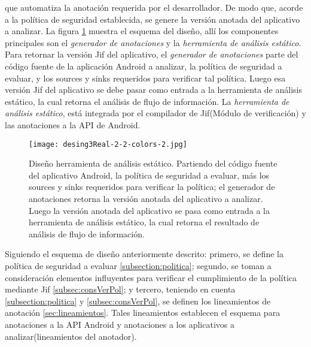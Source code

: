 que automatiza la anotación requerida por el desarrollador.
De modo que, acorde a la política de seguridad establecida, se genere la
versión anotada del aplicativo a analizar.\newline
La figura \ref{fig:desingReal} muestra el esquema del diseño, allí los componentes
principales son el \emph{generador de anotaciones} y la \emph{herramienta de
análisis estático}.\newline 
Para retornar la versión Jif del aplicativo, el \emph{generador de anotaciones}
parte del código fuente de la aplicación Android a analizar, la política de
seguridad a evaluar, y los sources y sinks requeridos para verificar tal
política.\newline 
Luego esa versión Jif del aplicativo se debe pasar como entrada a la herramienta
de análisis estático, la cual retorna el análisis de flujo de
información.\newline 
La \emph{herramienta de análisis estático}, está integrada
por el compilador de Jif(Módulo de verificación) y las anotaciones a la API de
Android.

\begin{figure}[t!]
	\begin{center} 
	\texttt{[image: desing3Real-2-2-colors-2.jpg]} 
	\end{center}
	\caption{Diseño herramienta de análisis estático.\newline
	Partiendo del código fuente del aplicativo Android, la política de seguridad a
	evaluar, más los sources y sinks requeridos para verificar la política; el
	generador de anotaciones retorna la versión anotada del aplicativo a analizar.
	Luego la versión anotada del aplicativo se pasa como entrada a la herramienta
	de análisis estático, la cual retorna el resultado de análisis de flujo de información.}
	\label{fig:desingReal}
\end{figure}

Siguiendo el esquema de diseño anteriormente descrito: primero, se define la
política de seguridad a evaluar \ref{subsection:politica}; segundo, se toman a
consideración elementos influyentes para verificar el cumplimiento de la
política mediante Jif \ref{subsec:consVerPol}; y tercero, teniendo en cuenta
\ref{subsection:politica} y \ref{subsec:consVerPol}, se definen los lineamientos
de anotación \ref{sec:lineamientos}. Tales lineamientos establecen el esquema
para anotaciones a la API Android y anotaciones a los aplicativos a
analizar(lineamientos del anotador).

